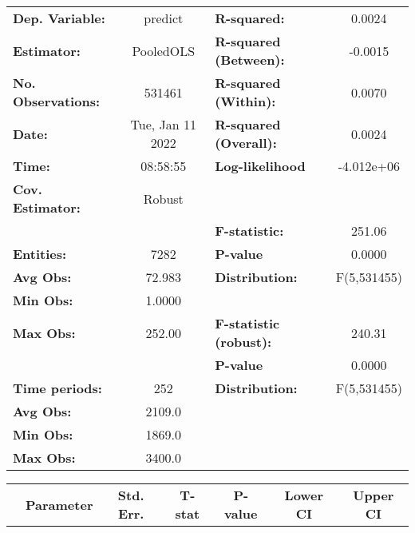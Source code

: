 \begin{center}
\begin{tabular}{lclc}
\toprule
\textbf{Dep. Variable:}    &      predict       & \textbf{  R-squared:         }   &      0.0024      \\
\textbf{Estimator:}        &     PooledOLS      & \textbf{  R-squared (Between):}  &     -0.0015      \\
\textbf{No. Observations:} &       531461       & \textbf{  R-squared (Within):}   &      0.0070      \\
\textbf{Date:}             &  Tue, Jan 11 2022  & \textbf{  R-squared (Overall):}  &      0.0024      \\
\textbf{Time:}             &      08:58:55      & \textbf{  Log-likelihood     }   &    -4.012e+06    \\
\textbf{Cov. Estimator:}   &       Robust       & \textbf{                     }   &                  \\
\textbf{}                  &                    & \textbf{  F-statistic:       }   &      251.06      \\
\textbf{Entities:}         &        7282        & \textbf{  P-value            }   &      0.0000      \\
\textbf{Avg Obs:}          &       72.983       & \textbf{  Distribution:      }   &   F(5,531455)    \\
\textbf{Min Obs:}          &       1.0000       & \textbf{                     }   &                  \\
\textbf{Max Obs:}          &       252.00       & \textbf{  F-statistic (robust):} &      240.31      \\
\textbf{}                  &                    & \textbf{  P-value            }   &      0.0000      \\
\textbf{Time periods:}     &        252         & \textbf{  Distribution:      }   &   F(5,531455)    \\
\textbf{Avg Obs:}          &       2109.0       & \textbf{                     }   &                  \\
\textbf{Min Obs:}          &       1869.0       & \textbf{                     }   &                  \\
\textbf{Max Obs:}          &       3400.0       & \textbf{                     }   &                  \\
\bottomrule
\end{tabular}
\begin{tabular}{lcccccc}
                & \textbf{Parameter} & \textbf{Std. Err.} & \textbf{T-stat} & \textbf{P-value} & \textbf{Lower CI} & \textbf{Upper CI}  \\

\end{tabular}
\end{center}
